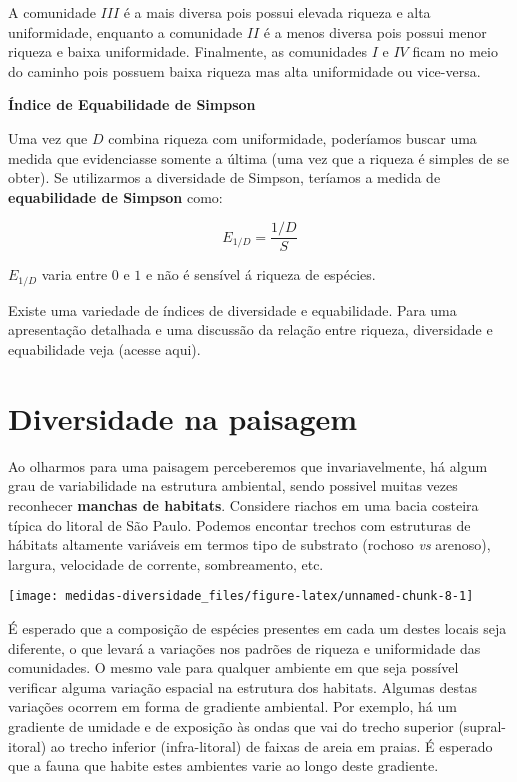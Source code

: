 \documentclass[
]{book}
\begin{document}
A comunidade \(III\) é a mais diversa pois possui elevada riqueza e alta uniformidade, enquanto a comunidade \(II\) é a menos diversa pois possui menor riqueza e baixa uniformidade. Finalmente, as comunidades \(I\) e \(IV\) ficam no meio do caminho pois possuem baixa riqueza mas alta uniformidade ou vice-versa.

\textbf{Índice de Equabilidade de Simpson}

Uma vez que \(D\) combina riqueza com uniformidade, poderíamos buscar uma medida que evidenciasse somente a última (uma vez que a riqueza é simples de se obter). Se utilizarmos a diversidade de Simpson, teríamos a medida de \textbf{equabilidade de Simpson} como:

\[E_{1/D} = \frac{1/D}{S}\]

\(E_{1/D}\) varia entre \(0\) e \(1\) e não é sensível á riqueza de espécies.

Existe uma variedade de índices de diversidade e equabilidade. Para uma apresentação detalhada \citet{magurran2011medindo} e uma discussão da relação entre riqueza, diversidade e equabilidade veja \citet{melo2008ganhamos} (acesse aqui).

\hypertarget{diversidade-na-paisagem}{%
\section{Diversidade na paisagem}\label{diversidade-na-paisagem}}

Ao olharmos para uma paisagem perceberemos que invariavelmente, há algum grau de variabilidade na estrutura ambiental, sendo possivel muitas vezes reconhecer \textbf{manchas de habitats}. Considere riachos em uma bacia costeira típica do litoral de São Paulo. Podemos encontar trechos com estruturas de hábitats altamente variáveis em termos tipo de substrato (rochoso \emph{vs} arenoso), largura, velocidade de corrente, sombreamento, etc.

\begin{center}\texttt{[image: medidas-diversidade\_files/figure-latex/unnamed-chunk-8-1]} \end{center}

É esperado que a composição de espécies presentes em cada um destes locais seja diferente, o que levará a variações nos padrões de riqueza e uniformidade das comunidades. O mesmo vale para qualquer ambiente em que seja possível verificar alguma variação espacial na estrutura dos habitats. Algumas destas variações ocorrem em forma de gradiente ambiental. Por exemplo, há um gradiente de umidade e de exposição às ondas que vai do trecho superior (supral-itoral) ao trecho inferior (infra-litoral) de faixas de areia em praias. É esperado que a fauna que habite estes ambientes varie ao longo deste gradiente.
\end{document}
